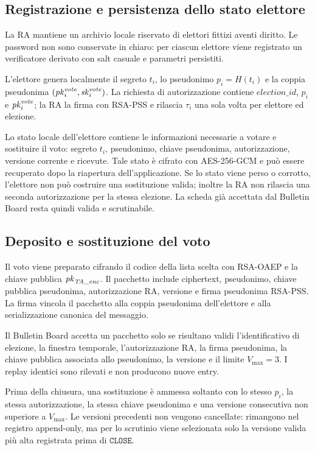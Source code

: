 \subsection{Registrazione e persistenza dello stato elettore}
\label{wp4:registrazione-persistenza}

La RA mantiene un archivio locale riservato di elettori fittizi aventi diritto. Le password non sono conservate in chiaro: per ciascun elettore viene registrato un verificatore derivato con salt casuale e parametri persistiti.

L'elettore genera localmente il segreto $t_i$, lo pseudonimo $p_i = H(t_i)$ e la coppia pseudonima $(\mathit{pk}_i^{\mathit{vote}}, \mathit{sk}_i^{\mathit{vote}})$. La richiesta di autorizzazione contiene $\mathit{election\_id}$, $p_i$ e $\mathit{pk}_i^{\mathit{vote}}$; la RA la firma con RSA-PSS e rilascia $\tau_i$ una sola volta per elettore ed elezione.

Lo stato locale dell'elettore contiene le informazioni necessarie a votare e sostituire il voto: segreto $t_i$, pseudonimo, chiave pseudonima, autorizzazione, versione corrente e ricevute. Tale stato \`e cifrato con AES-256-GCM e pu\`o essere recuperato dopo la riapertura dell'applicazione. Se lo stato viene perso o corrotto, l'elettore non pu\`o costruire una sostituzione valida; inoltre la RA non rilascia una seconda autorizzazione per la stessa elezione. La scheda gi\`a accettata dal Bulletin Board resta quindi valida e scrutinabile.

\subsection{Deposito e sostituzione del voto}
\label{wp4:deposito-sostituzione}

Il voto viene preparato cifrando il codice della lista scelta con RSA-OAEP e la chiave pubblica $\mathit{pk}_{\mathit{TA\_enc}}$. Il pacchetto include ciphertext, pseudonimo, chiave pubblica pseudonima, autorizzazione RA, versione e firma pseudonima RSA-PSS. La firma vincola il pacchetto alla coppia pseudonima dell'elettore e alla serializzazione canonica del messaggio.

Il Bulletin Board accetta un pacchetto solo se risultano validi l'identificativo di elezione, la finestra temporale, l'autorizzazione RA, la firma pseudonima, la chiave pubblica associata allo pseudonimo, la versione e il limite $V_{\max}=3$. I replay identici sono rilevati e non producono nuove entry.

Prima della chiusura, una sostituzione \`e ammessa soltanto con lo stesso $p_i$, la stessa autorizzazione, la stessa chiave pseudonima e una versione consecutiva non superiore a $V_{\max}$. Le versioni precedenti non vengono cancellate: rimangono nel registro append-only, ma per lo scrutinio viene selezionata solo la versione valida pi\`u alta registrata prima di $\texttt{CLOSE}$.

